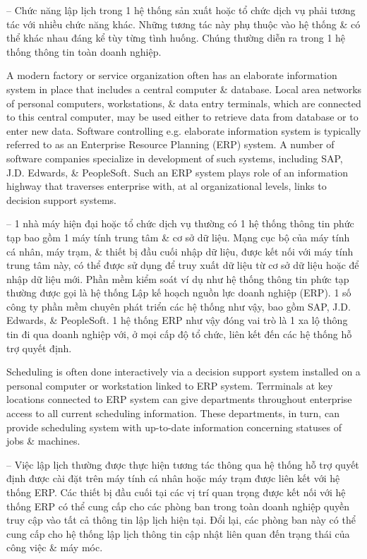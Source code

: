 \documentclass{article}
\begin{document}
\begin{itemize}
\begin{itemize}
        -- Chức năng lập lịch trong 1 hệ thống sản xuất hoặc tổ chức dịch vụ phải tương tác với nhiều chức năng khác. Những tương tác này phụ thuộc vào hệ thống \& có thể khác nhau đáng kể tùy từng tình huống. Chúng thường diễn ra trong 1 hệ thống thông tin toàn doanh nghiệp.

        A modern factory or service organization often has an elaborate information system in place that includes a central computer \& database. Local area networks of personal computers, workstations, \& data entry terminals, which are connected to this central computer, may be used either to retrieve data from database or to enter new data. Software controlling e.g. elaborate information system is typically referred to as an Enterprise Resource Planning (ERP) system. A number of software companies specialize in development of such systems, including SAP, J.D. Edwards, \& PeopleSoft. Such an ERP system plays role of an information highway that traverses enterprise with, at al organizational levels, links to decision support systems.

        -- 1 nhà máy hiện đại hoặc tổ chức dịch vụ thường có 1 hệ thống thông tin phức tạp bao gồm 1 máy tính trung tâm \& cơ sở dữ liệu. Mạng cục bộ của máy tính cá nhân, máy trạm, \& thiết bị đầu cuối nhập dữ liệu, được kết nối với máy tính trung tâm này, có thể được sử dụng để truy xuất dữ liệu từ cơ sở dữ liệu hoặc để nhập dữ liệu mới. Phần mềm kiểm soát ví dụ như hệ thống thông tin phức tạp thường được gọi là hệ thống Lập kế hoạch nguồn lực doanh nghiệp (ERP). 1 số công ty phần mềm chuyên phát triển các hệ thống như vậy, bao gồm SAP, J.D. Edwards, \& PeopleSoft. 1 hệ thống ERP như vậy đóng vai trò là 1 xa lộ thông tin đi qua doanh nghiệp với, ở mọi cấp độ tổ chức, liên kết đến các hệ thống hỗ trợ quyết định.

        Scheduling is often done interactively via a decision support system installed on a personal computer or workstation linked to ERP system. Terrminals at key locations connected to ERP system can give departments throughout enterprise access to all current scheduling information. These departments, in turn, can provide scheduling system with up-to-date information concerning statuses of jobs \& machines.

        -- Việc lập lịch thường được thực hiện tương tác thông qua hệ thống hỗ trợ quyết định được cài đặt trên máy tính cá nhân hoặc máy trạm được liên kết với hệ thống ERP. Các thiết bị đầu cuối tại các vị trí quan trọng được kết nối với hệ thống ERP có thể cung cấp cho các phòng ban trong toàn doanh nghiệp quyền truy cập vào tất cả thông tin lập lịch hiện tại. Đổi lại, các phòng ban này có thể cung cấp cho hệ thống lập lịch thông tin cập nhật liên quan đến trạng thái của công việc \& máy móc.


\end{itemize}
\end{itemize}
\end{document}

